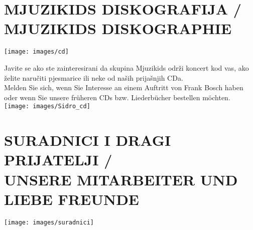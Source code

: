 \documentclass[a4paper,twoside, svgnames]{article}
\begin{document}
\vfill

\newpage

\section*{MJUZIKIDS DISKOGRAFIJA / MJUZIKIDS DISKOGRAPHIE}

\begin{center}
\vspace{1cm}
\texttt{[image: images/cd]}

\vspace{1cm}
Javite se ako ste zainteresirani da skupina Mjuzikids održi koncert kod vas,
ako želite naručiti pjesmarice ili neke od naših prijašnjih CDa.\\
\vspace{1cm}
Melden Sie sich, wenn Sie Interesse an einem Auftritt von Frank Bosch haben oder
wenn Sie unsere früheren CDs bzw. Liederbücher bestellen möchten.
\vfill
\texttt{[image: images/Sidro\_cd]}
\vfill

\end{center}

\newpage

\section*{SURADNICI I DRAGI PRIJATELJI /\\ UNSERE MITARBEITER UND LIEBE FREUNDE}
\begin{center}
\vspace{1cm}
\texttt{[image: images/suradnici]}\\
\end{center}
\end{document}
